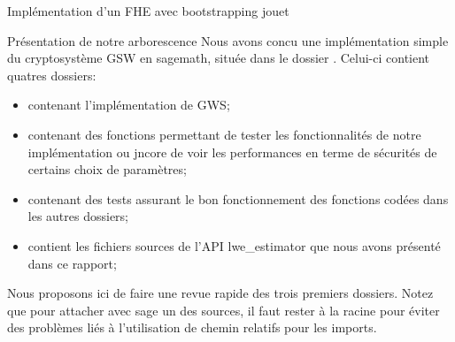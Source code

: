 \begin{section}{Implémentation d'un FHE avec bootstrapping \og{} jouet\fg{}}
\begin{subsection}{Présentation de notre arborescence}
Nous avons concu une implémentation simple 
du cryptosystème GSW en sagemath, située dans le dossier
. Celui-ci contient quatres dossiers:
\begin{itemize}
\item {} contenant l'implémentation de GWS;
\item {} contenant des fonctions permettant 
	de tester les fonctionnalités de notre implémentation 
	ou jncore de voir les performances 
	en terme de sécurités de certains choix de paramètres;
\item {} contenant des tests assurant le bon fonctionnement
	des fonctions codées dans les autres dossiers; 
\item {} contient les fichiers sources de l'API
	lwe\_estimator que nous avons présenté dans ce rapport; 
\end{itemize}

Nous proposons ici de faire une revue rapide des trois premiers dossiers. Notez que pour
\og attacher \fg avec sage un des sources, il faut rester à la racine pour
éviter des problèmes liés à l'utilisation de chemin relatifs pour les imports.



\end{subsection}
\end{section}
